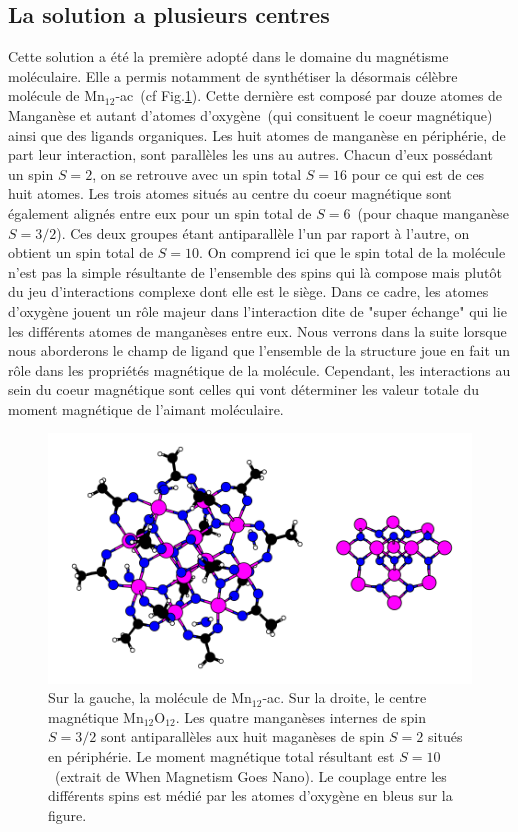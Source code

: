\subsection{La solution a plusieurs centres}
Cette solution a été la première adopté dans le domaine du magnétisme moléculaire. Elle a permis notamment de synthétiser la désormais célèbre molécule de Mn$_{12}$-ac~(cf Fig.\ref{Mn12}). Cette dernière est composé par douze atomes de Manganèse et autant d'atomes d'oxygène~(qui consituent le coeur magnétique) ainsi que des ligands organiques. Les huit atomes de manganèse en périphérie, de part leur interaction, sont parallèles les uns au autres. Chacun d'eux possédant un spin $S=2$, on se retrouve avec un spin total $S=16$ pour ce qui est de ces huit atomes. Les trois atomes situés au centre du coeur magnétique sont également alignés entre eux pour un spin total de $S=6$~(pour chaque manganèse $S=3/2$). Ces deux groupes étant antiparallèle l'un par raport à l'autre, on obtient un spin total de $S=10$. On comprend ici que le spin total de la molécule n'est pas la simple résultante de l'ensemble des spins qui là compose mais plut\^ot du jeu d'interactions complexe dont elle est le siège. Dans ce cadre, les atomes d'oxygène jouent un r\^ole majeur dans l'interaction dite de "super échange" qui lie les différents atomes de manganèses entre eux. Nous verrons dans la suite lorsque nous aborderons le champ de ligand que l'ensemble de la structure joue en fait un r\^ole dans les propriétés magnétique de la molécule. Cependant, les interactions au sein du coeur magnétique sont celles qui vont déterminer les valeur totale du moment magnétique de l'aimant moléculaire.
\begin{figure}
\centering \includegraphics[scale=0.3]{Theorie/MagMol/figure1/Mn12.png} 
\caption{Sur la gauche, la molécule de Mn$_{12}$-ac. Sur la droite, le centre magnétique Mn$_{12}$O$_{12}$. Les quatre manganèses internes de spin $S=3/2$ sont antiparallèles aux huit maganèses de spin $S=2$ situés en périphérie. Le moment magnétique total résultant est $S=10$~(extrait de When Magnetism Goes Nano). Le couplage entre les différents spins est médié par les atomes d'oxygène en bleus sur la figure.}
\label{Mn12}
\end{figure}

